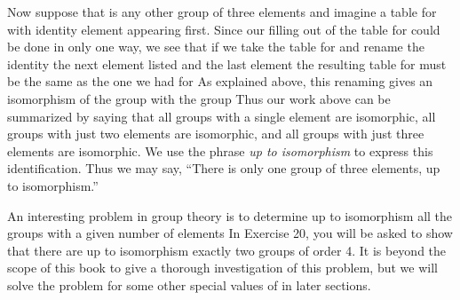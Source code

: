 \documentclass[11pt,oneside]{article}
\begin{document}
\begin{BookBody}
Now suppose that  is any other group of three elements and imagine a table for  with identity element appearing first. Since our filling out of the table for  could be done in only one way, we see that if we take the table for  and rename the identity  the next element listed  and the last element  the resulting table for  must be the same as the one we had for  As explained above, this renaming gives an isomorphism of the group  with the group  Thus our work above can be summarized 
by saying that all groups with a single element are isomorphic, all groups with just two elements are isomorphic, and all groups with just three elements are isomorphic. We use the phrase\textit{ up to isomorphism} to express this identification. Thus we may say, “There is only one group of three elements, up to isomorphism.”

\end{BookBody}

\BookNarrativetrue

\begin{BookBody}

An interesting problem in group theory is to determine up to isomorphism all the groups with a given number of elements  In Exercise 20, you will be asked to show that there are up to isomorphism exactly two groups of order 4. It is beyond the scope of this book to give a thorough investigation of this problem, but we will solve the problem for some other special values of  in later sections.

\end{BookBody}

\BookNarrativefalse
\end{document}
